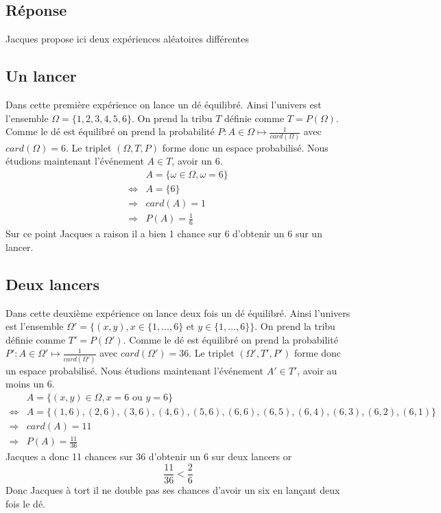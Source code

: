 \documentclass[10pt,a4paper,twoside]{article}
\begin{document}
\subsection*{Réponse}
Jacques propose ici deux expériences aléatoires différentes
\subsection{Un lancer}
Dans cette première expérience on lance un dé équilibré. Ainsi l'univers est l'ensemble $\Omega = \{1,2,3,4,5,6\}$. On prend la tribu $T$ définie comme $T=P(\Omega)$. Comme le dé est équilibré on prend la probabilité $P:A\in \Omega \mapsto \frac{1}{card(\Omega)}$ avec $card(\Omega)=6$. Le triplet $(\Omega,T,P)$ forme donc un espace probabilisé. Nous étudions maintenant l'événement $A\in T$, avoir un 6. 
\begin{align*}
 & A=\{\omega\in\Omega, \omega=6\}\\ 
\Leftrightarrow & A=\{6\}\\
\Rightarrow & card(A)=1\\
\Rightarrow & P(A)=\frac{1}{6}
\end{align*}
Sur ce point Jacques a raison il a bien 1 chance sur 6 d'obtenir un 6 sur un lancer.

\subsection{Deux lancers}
Dans cette deuxième expérience on lance deux fois un dé équilibré. Ainsi l'univers est l'ensemble $\Omega' = \{(x,y), x\in \{1,\ldots,6\}\text{ et }y\in \{1,\ldots,6\}\}$. On prend la tribu définie comme $T'=P(\Omega')$. Comme le dé est équilibré on prend la probabilité $P':A\in \Omega' \mapsto \frac{1}{card(\Omega')}$ avec $card(\Omega')=36$. Le triplet $(\Omega',T',P')$ forme donc un espace probabilisé. Nous étudions maintenant l'événement $A'\in T'$, avoir au moins un 6.
\begin{align*}
 & A=\{(x,y)\in\Omega, x=6\text{ ou }y=6\}\\ 
\Leftrightarrow & A=\{(1,6),(2,6),(3,6),(4,6),(5,6),(6,6),(6,5),(6,4),(6,3),(6,2),(6,1)\}\\
\Rightarrow & card(A)=11\\
\Rightarrow & P(A)=\frac{11}{36}
\end{align*}
Jacques a donc 11 chances sur 36 d'obtenir un 6 sur deux lancers or
$$\frac{11}{36} < \frac{2}{6}$$
Donc Jacques à tort il ne double pas ses chances d'avoir un six en lançant deux fois le dé.
\end{document}
